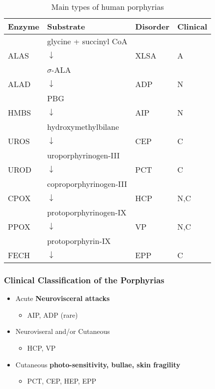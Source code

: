 \documentclass[12pt]{scrartcl}
\begin{document}
\begin{table}[htbp]
\caption{\label{tab:org29fc807}Main types of human porphyrias}
\centering
\begin{tabular}{llll}
Enzyme & Substrate & Disorder & Clinical\footnotemark\\
\hline
 & glycine + succinyl CoA &  & \\
ALAS & \(\downarrow\) & XLSA & A\\
 & \(\sigma\)-ALA &  & \\
ALAD & \(\downarrow\) & ADP & N\\
 & PBG &  & \\
HMBS & \(\downarrow\) & AIP & N\\
 & hydroxymethylbilane &  & \\
UROS & \(\downarrow\) & CEP & C\\
 & uroporphyrinogen-III &  & \\
UROD & \(\downarrow\) & PCT & C\\
 & coproporphyrinogen-III &  & \\
CPOX & \(\downarrow\) & HCP & N,C\\
 & protoporphyrinogen-IX &  & \\
PPOX & \(\downarrow\) & VP & N,C\\
 & protoporphyrin-IX &  & \\
FECH & \(\downarrow\) & EPP & C\\
\end{tabular}
\end{table}

\subsubsection{Clinical Classification of the Porphyrias}
\label{sec:org974305a}
\begin{itemize}
\item Acute \textbf{Neurovisceral attacks}
\begin{itemize}
\item AIP, ADP (rare)
\end{itemize}

\item Neuroviseral and/or Cutaneous
\begin{itemize}
\item HCP, VP
\end{itemize}

\item Cutaneous \textbf{photo-sensitivity, bullae, skin fragility}
\begin{itemize}
\item PCT, CEP, HEP, EPP
\end{itemize}
\end{itemize}
\end{document}
